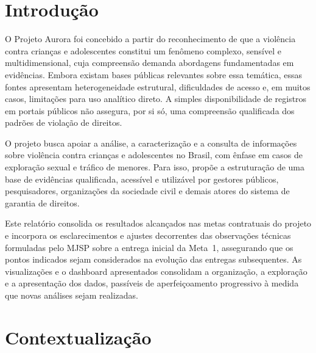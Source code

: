 \documentclass[11pt,a4paper]{article}
\begin{document}
\clearpage
\section{Introdução}
\label{sec:introducao}

O Projeto Aurora foi concebido a partir do reconhecimento de que a violência contra crianças e adolescentes constitui um fenômeno complexo, sensível e multidimensional, cuja compreensão demanda abordagens fundamentadas em evidências. Embora existam bases públicas relevantes sobre essa temática, essas fontes apresentam heterogeneidade estrutural, dificuldades de acesso e, em muitos casos, limitações para uso analítico direto. A simples disponibilidade de registros em portais públicos não assegura, por si só, uma compreensão qualificada dos padrões de violação de direitos.

O projeto busca apoiar a análise, a caracterização e a consulta de informações sobre violência contra crianças e adolescentes no Brasil, com ênfase em casos de exploração sexual e tráfico de menores. Para isso, propõe a estruturação de uma base de evidências qualificada, acessível e utilizável por gestores públicos, pesquisadores, organizações da sociedade civil e demais atores do sistema de garantia de direitos.

Este relatório consolida os resultados alcançados nas metas contratuais do projeto e incorpora os esclarecimentos e ajustes decorrentes das observações técnicas formuladas pelo MJSP sobre a entrega inicial da Meta~1, assegurando que os pontos indicados sejam considerados na evolução das entregas subsequentes. As visualizações e o dashboard apresentados consolidam a organização, a exploração e a apresentação dos dados, passíveis de aperfeiçoamento progressivo à medida que novas análises sejam realizadas.




\clearpage
\section{Contextualização}
\label{sec:contexto}
\end{document}
